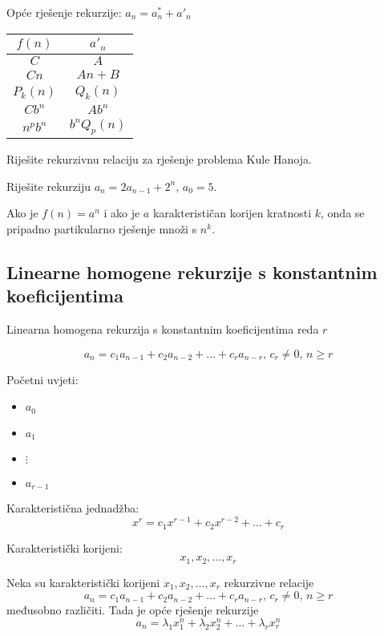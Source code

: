Opće rješenje rekurzije: $\displaystyle a_n = a_n^*+a'_n$

\begin{center}
    \begin{tabular}{c|c}
        $f(n)$ & $a'_n$ \\
        \hline
        $C$ & $A$ \\
        $Cn$ & $An+B$ \\
        $P_k(n)$ & $Q_k(n)$ \\
        $Cb^n$ & $Ab^n$ \\
        $n^pb^n$ & $b^nQ_p(n)$
    \end{tabular}
\end{center}

\begin{example}
    Riješite rekurzivnu relaciju za rješenje problema Kule Hanoja.
\end{example}

\begin{example}
    Riješite rekurziju $a_n = 2a_{n-1}+2^n,\, a_0 = 5$.
\end{example}

Ako je $f(n) = a^n$ i ako je $a$ karakterističan korijen kratnosti $k$, onda se pripadno partikularno rješenje množi s $n^k$.

\subsection{Linearne homogene rekurzije s konstantnim koeficijentima}

Linearna homogena rekurzija s konstantnim koeficijentima reda $r$

$$
    a_n = c_1a_{n-1}+c_2a_{n-2}+\dots+c_ra_{n-r},\, c_r \neq 0,\, n \geq r
$$

Početni uvjeti:

\begin{itemize}
    \item $a_0$
    \item $a_1$
    \item $\vdots$
    \item $a_{r-1}$
\end{itemize}

Karakteristična jednadžba:
$$
x^r = c_1x^{r-1}+c_2x^{r-2}+\dots+c_r
$$

Karakteristički korijeni:
$$
x_1,x_2,\dots,x_r
$$

\begin{theorem}
    Neka su karakteristički korijeni $x_1,x_2,\dots,x_r$ rekurzivne relacije
    $$
        a_n = c_1a_{n-1}+c_2a_{n-2}+\dots+c_ra_{n-r},\, c_r \neq 0,\, n \geq r
    $$
    međusobno različiti. Tada je opće rješenje rekurzije
    $$
        a_n = \lambda_1x_1^n+\lambda_2x_2^n+\dots+\lambda_rx_r^n
    $$
\end{theorem}

